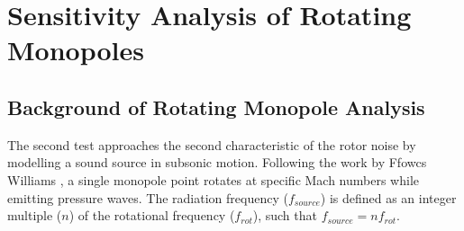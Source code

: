 
\section{Sensitivity Analysis of Rotating Monopoles} \label{sec:rotating_sensitivity}

\subsection{Background of Rotating Monopole Analysis} \label{subsec:BG_rotating}

The second test approaches the second characteristic of the rotor noise by modelling a sound source in subsonic motion. Following the work by Ffowcs Williams \cite{crighton1992modern}, a single monopole point rotates at specific Mach numbers while emitting pressure waves. The radiation frequency ($f_{source}$) is defined as an integer multiple ($n$) of the rotational frequency ($f_{rot}$), such that $f_{source}=nf_{rot}$.